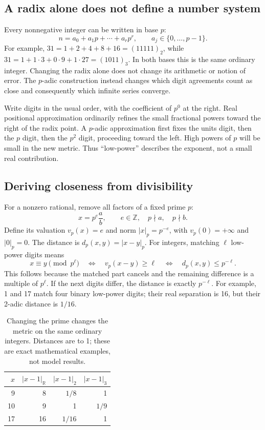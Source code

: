 \documentclass[11pt]{article}
\newcommand{\R}{\mathbb{R}}
\newcommand{\Z}{\mathbb{Z}}
\newcommand{\vp}{v_p}
\begin{document}
\subsection{A radix alone does not define a number system}

Every nonnegative integer can be written in base \(p\):
\[
 n=a_0+a_1p+\cdots+a_rp^r,\qquad a_j\in\{0,\ldots,p-1\}.
\]
For example, \(31=1+2+4+8+16=(11111)_2\), while
\(31=1+1\cdot3+0\cdot9+1\cdot27=(1011)_3\).
In both bases this is the same ordinary integer.
Changing the radix alone does not change its arithmetic or notion of error.
The \(p\)-adic construction instead changes which digit agreements count as
close and consequently which infinite series converge.

Write digits in the usual order, with the coefficient of \(p^0\) at the
right. Real positional approximation ordinarily refines the small fractional
powers toward the right of the radix point. A \(p\)-adic approximation first
fixes the units digit, then the \(p\) digit, then the \(p^2\) digit, proceeding
toward the left. High powers of \(p\) will be small in the new metric. Thus
``low-power'' describes the exponent, not a small real contribution.

\subsection{Deriving closeness from divisibility}

For a nonzero rational, remove all factors of a fixed prime \(p\):
\[
 x=p^e\frac{a}{b},\qquad e\in\Z,\quad p\nmid a,\quad p\nmid b.
\]
Define its valuation \(\vp(x)=e\) and norm \(|x|_p=p^{-e}\), with
\(\vp(0)=+\infty\) and \(|0|_p=0\). The distance is
\(d_p(x,y)=|x-y|_p\). For integers, matching \(\ell\) low-power digits means
\[
 x\equiv y\pmod{p^\ell}\quad\Longleftrightarrow\quad
 \vp(x-y)\geq\ell\quad\Longleftrightarrow\quad d_p(x,y)\leq p^{-\ell}.
\]
This follows because the matched part cancels and the remaining difference
is a multiple of \(p^\ell\). If the next digits differ, the distance is exactly
\(p^{-\ell}\). For example, 1 and 17 match four binary low-power digits;
their real separation is 16, but their 2-adic distance is \(1/16\).

\begin{table}[htbp]
\centering
\caption{Changing the prime changes the metric on the same ordinary integers.
Distances are to 1; these are exact mathematical examples, not model results.}
\label{tab:metric-examples}
\begin{tabular}{rrrr}
\toprule
\(x\) & \(|x-1|_{\R}\) & \(|x-1|_2\) & \(|x-1|_3\)\\
\midrule
9 & 8 & \(1/8\) & 1\\
10 & 9 & 1 & \(1/9\)\\
17 & 16 & \(1/16\) & 1\\
\bottomrule
\end{tabular}
\end{table}
\end{document}
